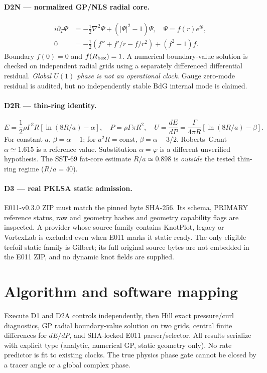 \documentclass[10pt,a4paper]{article}
\begin{document}
\paragraph{D2N --- normalized GP/NLS radial core.}
\begin{align}
 i\partial_T\Psi&=-\frac12\nabla^2\Psi+(|\Psi|^2-1)\Psi,\quad \Psi=f(r)e^{i\theta},\\
 0&=-\frac12\left(f''+f'/r-f/r^2\right)+(f^2-1)f.
\end{align}
Boundary $f(0)=0$ and $f(R_{\rm box})=1$. A numerical boundary-value solution is checked on independent radial grids using a separately differenced differential residual. \emph{Global $U(1)$ phase is not an operational clock}. Gauge zero-mode residual is audited, but no independently stable BdG internal mode is claimed.
\paragraph{D2R --- thin-ring identity.}
\begin{equation}
 E=\frac12\rho\Gamma^2R[\ln(8R/a)-\alpha],\quad P=\rho\Gamma\pi R^2,\quad U=\frac{dE}{dP}=\frac{\Gamma}{4\pi R}[\ln(8R/a)-\beta].
\end{equation}
For constant $a$, $\beta=\alpha-1$; for $a^2R=\mathrm{const}$, $\beta=\alpha-3/2$. Roberts--Grant $\alpha\simeq1.615$ is a reference value. Substitution $\alpha=\varphi$ is a different unverified hypothesis. The SST-69 fat-core estimate $R/a\simeq0.898$ is \emph{outside} the tested thin-ring regime ($R/a=40$).
\paragraph{D3 --- real PKLSA static admission.}
E011-v0.3.0 ZIP must match the pinned byte SHA-256. Its schema, PRIMARY reference status, raw and geometry hashes and geometry capability flags are inspected. A provider whose source family contains KnotPlot, legacy or VortexLab is excluded even when E011 marks it static ready. The only eligible trefoil static family is Gilbert; its full original source bytes are not embedded in the E011 ZIP, and no dynamic knot fields are supplied.
\section{Algorithm and software mapping}
Execute D1 and D2A controls independently, then Hill exact pressure/curl diagnostics, GP radial boundary-value solution on two grids, central finite differences for $dE/dP$, and SHA-locked E011 parser/selector. All results serialize with explicit type (analytic, numerical GP, static geometry only). No rate predictor is fit to existing clocks. The true physics phase gate cannot be closed by a tracer angle or a global complex phase.
\end{document}
